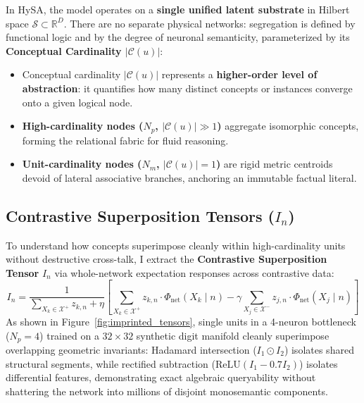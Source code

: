\documentclass[11pt,a4paper]{article}
\theoremstyle{definition}
\begin{document}
In HySA, the model operates on a \textbf{single unified latent substrate} in Hilbert space $\mathcal{S} \subset \mathbb{R}^D$. There are no separate physical networks: segregation is defined by functional logic and by the degree of neuronal semanticity, parameterized by its \textbf{Conceptual Cardinality $|\mathcal{C}(u)|$}:

\begin{itemize}[leftmargin=*, itemsep=2.0pt]
    \item Conceptual cardinality $|\mathcal{C}(u)|$ represents a \textbf{higher-order level of abstraction}: it quantifies how many distinct concepts or instances converge onto a given logical node.
    \item \textbf{High-cardinality nodes ($N_p$, $|\mathcal{C}(u)| \gg 1$)} aggregate isomorphic concepts, forming the relational fabric for fluid reasoning.
    \item \textbf{Unit-cardinality nodes ($N_m$, $|\mathcal{C}(u)|=1$)} are rigid metric centroids devoid of lateral associative branches, anchoring an immutable factual literal.
\end{itemize}

\subsection{Contrastive Superposition Tensors \texorpdfstring{($I_n$)}{(In)}}

To understand how concepts superimpose cleanly within high-cardinality units without destructive cross-talk, I extract the \textbf{Contrastive Superposition Tensor} $I_n$ via whole-network expectation responses across contrastive data:
\begin{equation}
    I_n = \frac{1}{\sum_{X_k \in \mathcal{X}^+} z_{k,n} + \eta} \left[ \sum_{X_k \in \mathcal{X}^+} z_{k,n} \cdot \Phi_{\mathrm{net}}(X_k \mid n) - \gamma \sum_{X_j \in \mathcal{X}^-} z_{j,n} \cdot \Phi_{\mathrm{net}}(X_j \mid n) \right]
    \label{eq:imprinted_tensor}
\end{equation}
As shown in Figure~\ref{fig:imprinted_tensors}, single units in a 4-neuron bottleneck ($N_p=4$) trained on a $32 \times 32$ synthetic digit manifold cleanly superimpose overlapping geometric invariants: Hadamard intersection ($I_1 \odot I_2$) isolates shared structural segments, while rectified subtraction ($\mathrm{ReLU}(I_1 - 0.7 I_2)$) isolates differential features, demonstrating exact algebraic queryability without shattering the network into millions of disjoint monosemantic components.
\end{document}
